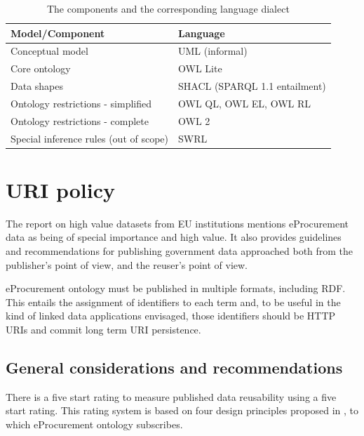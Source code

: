 	\begin{table}[!ht]
		\begin{tabular}{@{}ll@{}}
			\toprule
			Model/Component                        & Language                      \\ \midrule
			Conceptual model                       & UML (informal)                \\
			Core ontology                          & OWL Lite                      \\
			Data shapes                            & SHACL (SPARQL 1.1 entailment) \\
			Ontology restrictions - simplified     & OWL QL, OWL EL, OWL RL        \\
			Ontology restrictions - complete       & OWL 2                         \\
			Special inference rules (out of scope) & SWRL                          \\ \bottomrule
		\end{tabular}
		\caption{The components and the corresponding language dialect}
		\label{tab:expressivity}
	\end{table}
	

\section{URI policy}
\label{sec:uri-policy}

	The report on high value datasets from EU institutions \citep{d-high-value-assets} mentions eProcurement data as being of special importance and high value. It also provides guidelines and recommendations for  publishing government data approached both from the publisher's point of view, and the reuser's point of view. 
	
	eProcurement ontology must be published in multiple formats, including RDF. This entails the assignment of identifiers to each term and, to be useful in the kind of linked data applications envisaged, those identifiers should be HTTP URIs and commit long term URI persistence.
	
	\subsection{General considerations and recommendations}
	\label{sec:considerations}
	There is a five start rating \cite{berners5star} to measure published data reusability using a five start rating. This rating system is based on four design principles proposed in \citet{berners2006linked}, to which eProcurement ontology subscribes.
	
